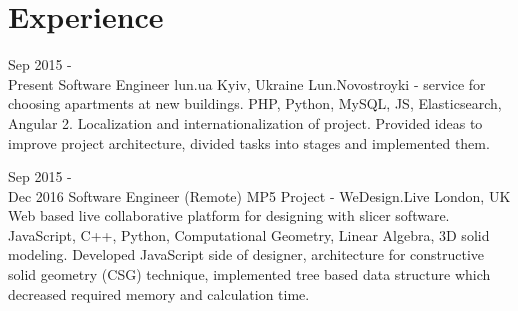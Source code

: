 \documentclass[letterpaper]{twentysecondcv} %
\begin{document}
\section{Experience}

\begin{twenty} %
	\twentyitem
    	{Sep 2015 - \\Present}
        {Software Engineer}
        {lun.ua}
        {Kyiv, Ukraine}
        {Lun.Novostroyki - service for choosing apartments at new buildings.
        {
        PHP, Python, MySQL, JS, Elasticsearch, Angular 2. Localization and internationalization of project. Provided ideas to improve project architecture, divided tasks into stages and implemented them. 
        }
        }
        
    \twentyitem
   	{Sep 2015 - \\Dec 2016}
        {Software Engineer (Remote)}
        {MP5 Project - WeDesign.Live}
        {London, UK}
        {Web based live collaborative platform for designing with slicer software.
        {JavaScript, C++, Python, Computational Geometry, Linear Algebra,  3D solid modeling. Developed JavaScript side of designer, architecture for constructive solid geometry (CSG) technique, implemented tree based data structure which decreased required memory and calculation time.
        }
        }
\end{twenty}
\end{document}
